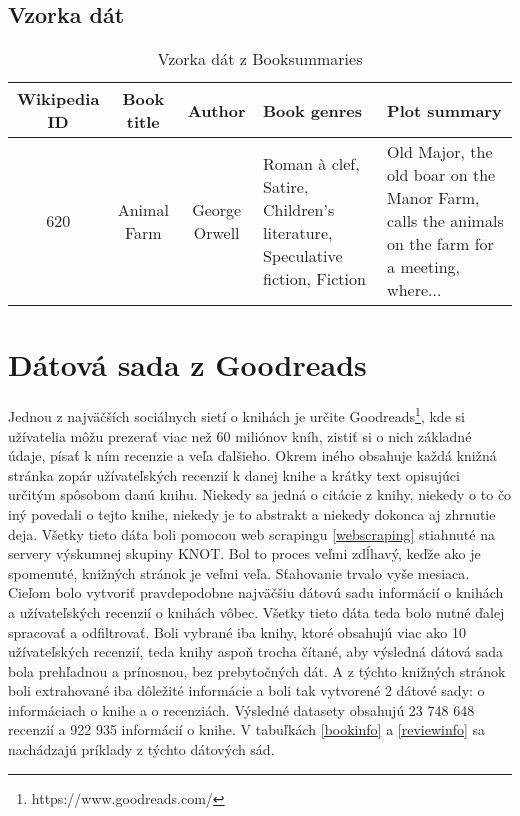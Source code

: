 \subsection*{Vzorka dát}

\begin{table}[hbt]
\centering
\caption{Vzorka dát z Booksummaries}
\label{booksummaries}
\begin{tabular}{|c|c|c|
>{\centering\arraybackslash}m{7em}|
>{\centering\arraybackslash}m{7em}|}
\hline
Wikipedia ID & Book title & Author & Book genres & Plot summary \\
\hline
620 & Animal Farm & George Orwell & Roman à clef, Satire, Children's literature, Speculative fiction, Fiction &  Old Major, the old boar on the Manor Farm, calls the animals on the farm for a meeting, where...\\ 
\hline

\end{tabular}
\end{table}

\section{Dátová sada z Goodreads} \label{goodreadsdata}

Jednou z najväčších sociálnych sietí o knihách je určite Goodreads\footnote{https://www.goodreads.com/}, kde si užívatelia môžu prezerať viac než 60 miliónov kníh, zistiť si o nich základné údaje, písať k ním recenzie a veľa ďalšieho. Okrem iného obsahuje každá knižná stránka zopár užívateľských recenzií k danej knihe a krátky text opisujúci určitým spôsobom danú knihu. Niekedy sa jedná o citácie z knihy, niekedy o to čo iný povedali o tejto knihe, niekedy je to abstrakt a niekedy dokonca aj zhrnutie deja. Všetky tieto dáta boli pomocou web scrapingu \ref{webscraping} stiahnuté na servery výskumnej skupiny KNOT. Bol to proces veľmi zdĺhavý, keďže ako je spomenuté, knižných stránok je veľmi veľa. Sťahovanie trvalo vyše mesiaca. Cieľom bolo vytvoriť pravdepodobne najväčšiu dátovú sadu informácií o knihách a užívateľských recenzií o knihách vôbec. Všetky tieto dáta teda bolo nutné ďalej spracovať a odfiltrovať. Boli vybrané iba knihy, ktoré obsahujú viac ako 10 užívateľských recenzií, teda knihy aspoň trocha čítané, aby výsledná dátová sada bola prehľadnou a prínosnou, bez prebytočných dát. A z týchto knižných stránok boli extrahované iba dôležité informácie a boli tak vytvorené 2 dátové sady: o informáciach o knihe a o recenziách. Výsledné datasety obsahujú 23 748 648 recenzií a 922 935 informácií o knihe. V tabuľkách 
\ref{bookinfo} a \ref{reviewinfo} sa nachádzajú príklady z týchto dátových sád.

